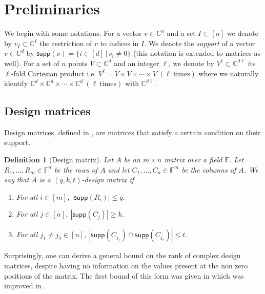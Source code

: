 \documentclass[11pt]{article}
\newtheorem{define}[thm]{Definition}
\def\F{{\mathbb{F}}}
\def\C{{\mathbb{C}}}
\def\supp{\textsf{supp}}
\begin{document}
\section{Preliminaries}\label{sec-prelim}

We begin with some notations.  For a vector $v \in \C^n$ and a set $I \subset [n]$ we denote by $v_I \subset \C^I$ the restriction of $v$ to indices in $I$. We denote the {\em support} of a vector $v \in \C^d$ by $\supp(v) = \{ i \in [d]\,|\, v_i \neq 0 \}$ (this notation is extended to matrices as well). For a set of $n$ points $V \subset \C^d$ and an integer $\ell$, we denote by $V^\ell \subset \C^{d\ell}$ its $\ell$-fold Cartesian product i.e. $V^\ell=V\times V\times \cdots \times V\ (\ell\ \mathrm{times})$ where we naturally identify $\C^d\times \C^d\times \cdots \times \C^d\ (\ell\ \mathrm{times})$ with $\C^{d\ell}$.


\subsection{Design matrices}
\label{sec-design-matrices}

Design matrices, defined in \cite{BDWY12}, are matrices that satisfy a certain condition on their support. 

\begin{define}[Design matrix]\label{def-designmatrix}
Let $A$ be an $m \times n$ matrix over a field $\F$. Let $R_1,\ldots,R_m \in \F^n$ be  the rows of $A$ and let $C_1,\ldots,C_n \in \F^m$ be the columns of $A$. We say that $A$ is a {\em $(q,k,t)$-design matrix} if
\begin{enumerate}
\item For all $i \in [m]$, $|\supp(R_i)| \leq q$.
\item For all $j \in [n]$, $|\supp(C_j)| \geq k$.
\item For all $j_1 \neq j_2 \in [n]$, $|\supp(C_{j_1}) \cap \supp(C_{j_2}) | \leq t$.
\end{enumerate}
\end{define}

Surprisingly, one can derive a general bound on the rank of complex design matrices, despite having no information on the values present at the non zero positions of the matrix. The first bound of this form was given in \cite{BDWY12} which was improved in \cite{DSW12}.
\end{document}
